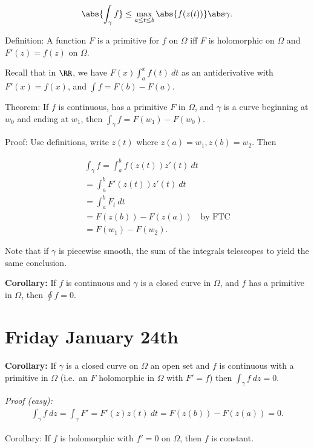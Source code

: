 \begin{align*}
\abs{\int_\gamma f} \leq \max_{a\leq t \leq b} \abs{f(z(t))} \abs\gamma
.\end{align*}

Definition: A function \(F\) is a primitive for \(f\) on \(\Omega\) iff
\(F\) is holomorphic on \(\Omega\) and \(F'(z) = f(z)\) on \(\Omega\).

Recall that in \(\RR\), we have \(F(x) \int_a^x f(t)~dt\) as an
antiderivative with \(F'(x) = f(x)\), and \(\int f = F(b) - F(a)\).

Theorem: If \(f\) is continuous, has a primitive \(F\) in \(\Omega\),
and \(\gamma\) is a curve beginning at \(w_0\) and ending at \(w_1\),
then \(\int_\gamma f = F(w_1) - F(w_0)\).

Proof: Use definitions, write \(z(t)\) where \(z(a) = w_1, z(b) = w_2\).
Then

\begin{align*}
\int_\gamma f = \int_a^b f(z(t)) z'(t) ~ dt \\
= \int_a^b F'(z(t)) z'(t) ~dt \\
= \int_a^b F_t ~dt \\
= F(z(b)) - F(z(a)) \quad\text{by FTC}\\
= F(w_1) - F(w_2)
.\end{align*}

Note that if \(\gamma\) is piecewise smooth, the sum of the integrals
telescopes to yield the same conclusion.

\textbf{Corollary:} If \(f\) is continuous and \(\gamma\) is a closed
curve in \(\Omega\), and \(f\) has a primitive in \(\Omega\), then
\(\oint f = 0\).

\hypertarget{friday-january-24th}{%
\section{Friday January 24th}\label{friday-january-24th}}

\textbf{Corollary:} If \(\gamma\) is a closed curve on \(\Omega\) an
open set and \(f\) is continuous with a primitive in \(\Omega\) (i.e.~an
\(F\) holomorphic in \(\Omega\) with \(F'=f\)) then
\(\int_\gamma f ~dz = 0\).

\emph{Proof (easy):} \begin{align*}
\int_\gamma f ~dz = \int_\gamma F' = F'(z) z(t) ~dt  = F(z(b)) - F(z(a)) = 0
.\end{align*}

Corollary: If \(f\) is holomorphic with \(f'=0\) on \(\Omega\), then
\(f\) is constant.

